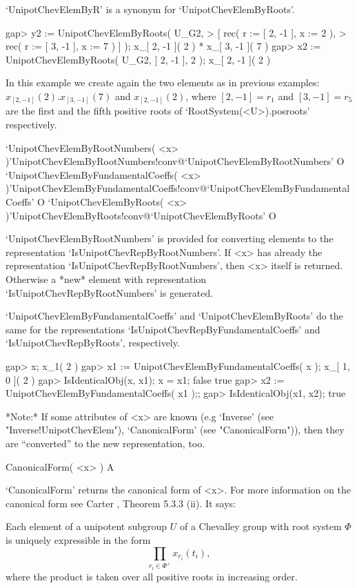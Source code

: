 `UnipotChevElemByR' is a synonym for `UnipotChevElemByRoots'.

\beginexample
gap> y2 := UnipotChevElemByRoots( U_G2,
>      [ rec( r := [ 2, -1 ], x := 2 ),
>        rec( r := [ 3, -1 ], x := 7 ) ] );
x_{[ 2, -1 ]}( 2 ) * x_{[ 3, -1 ]}( 7 )
gap> x2 := UnipotChevElemByRoots( U_G2, [ 2, -1 ], 2 );
x_{[ 2, -1 ]}( 2 )
\endexample

In this example we create again the two elements as in previous examples: 
$x_{[ 2, -1 ]}( 2 ) . x_{[ 3, -1 ]}( 7 )$ and $x_{[ 2, -1 ]}( 2 )$,
where $[ 2, -1 ] = r_1$ and $[ 3, -1 ] = r_5$
are the first and the fifth positive roots of `RootSystem(<U>).posroots'
respectively.



\>`UnipotChevElemByRootNumbers( <x> )'{UnipotChevElemByRootNumbers!conv}@{`UnipotChevElemByRootNumbers'} O
\>`UnipotChevElemByFundamentalCoeffs( <x> )'{UnipotChevElemByFundamentalCoeffs!conv}@{`UnipotChevElemByFundamentalCoeffs'} O
\>`UnipotChevElemByRoots( <x> )'{UnipotChevElemByRoots!conv}@{`UnipotChevElemByRoots'} O

`UnipotChevElemByRootNumbers' is provided for converting elements to the
representation `IsUnipotChev\-RepByRootNumbers'. If <x> has already the
representation `IsUnipotChevRepByRootNumbers', then <x> itself is
returned. Otherwise a *new* element with representation
`IsUnipotChevRepByRootNumbers' is generated.

`UnipotChevElemByFundamentalCoeffs' and `UnipotChevElemByRoots' do the
same for the representations `IsUnipotChevRepByFundamentalCoeffs' and
`IsUnipotChevRepByRoots', respectively. 

\beginexample
gap> x;
x_{1}( 2 )
gap> x1 := UnipotChevElemByFundamentalCoeffs( x );
x_{[ 1, 0 ]}( 2 )
gap> IsIdenticalObj(x, x1); x = x1;
false
true
gap> x2 := UnipotChevElemByFundamentalCoeffs( x1 );;
gap> IsIdenticalObj(x1, x2);
true
\endexample

*Note:* If some attributes of <x> are known (e.g `Inverse' (see
"Inverse!UnipotChevElem"), `CanonicalForm' (see "CanonicalForm")),
then they are ``converted'' to the new representation, too.

\>CanonicalForm( <x> ) A

`CanonicalForm' returns the canonical form of <x>. 
For more information on the canonical form see Carter \cite{Carter72},
Theorem 5.3.3 (ii). It says:

   Each element of a unipotent subgroup $U$ of a Chevalley group with
   root system $\Phi$ is uniquely expressible in the form 
           $$\prod_{r_i\in\Phi^+} x_{r_i}(t_i),$$
   where the product is taken over all positive roots in increasing order.
   

